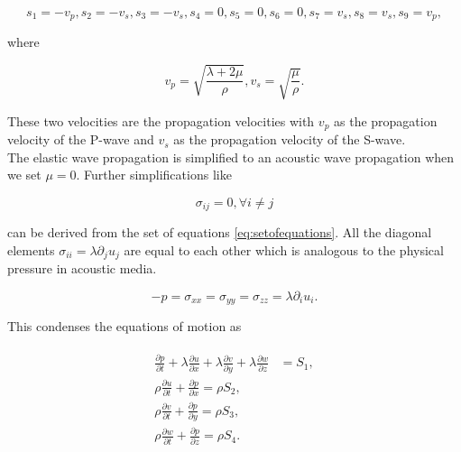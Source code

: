 \begin{equation}
    s_1 = -v_p, s_2 = -v_s, s_3 = -v_s, s_4=0, s_5 = 0, s_6 = 0, s_7 = v_s, s_8 = v_s, s_9 = v_p,
\end{equation}

where

\begin{equation}
    v_p = \sqrt{\frac{\lambda + 2\mu}{\rho}}, v_s = \sqrt{\frac{\mu}{\rho}}.
    \label{eq:wavevelocities}
\end{equation}

These two velocities are the propagation velocities with $v_p$ as the propagation velocity of the P-wave and $v_s$ as the propagation velocity of the S-wave. \\

The elastic wave propagation is simplified to an acoustic wave propagation when we set $\mu = 0$. Further simplifications like

\begin{equation}
    \sigma_{ij} = 0, \forall i \neq j
\end{equation}

can be derived from the set of equations \ref{eq:setofequations}. All the diagonal elements $\sigma_{ii} = \lambda \partial_j u_j$
are equal to each other which is analogous to the physical pressure in acoustic media. 

\begin{equation}
    -p = \sigma_{xx} = \sigma_{yy} = \sigma_{zz} = \lambda \partial_iu_i .
\end{equation}


This condenses the equations of motion as

\begin{align}
    \begin{split}
        \frac{\partial p}{\partial t} + \lambda \frac{\partial u}{\partial x} + \lambda \frac{\partial v}{\partial y} + \lambda \frac{\partial w}{\partial z} &= S_1, \\
        \rho \frac{\partial u}{\partial t} + \frac{\partial p}{\partial x} = \rho S_2, \\
        \rho \frac{\partial v}{\partial t} + \frac{\partial p}{\partial y} = \rho S_3, \\
        \rho \frac{\partial w}{\partial t} + \frac{\partial p}{\partial z} = \rho S_4. \\
    \end{split}
    \label{eq:acousticequations}
\end{align}

